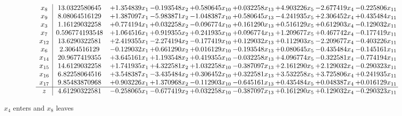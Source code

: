 \documentclass[10pt]{article}
\begin{document}
 \[\begin{array}{c| c c@{\hskip 2pt} c@{\hskip 2pt} c@{\hskip 2pt} c@{\hskip 2pt} c@{\hskip 2pt} c@{\hskip 2pt} c@{\hskip 2pt} }
 x_{8}   &  13.0322580645 & + 1.354839 x_{1} & -0.193548 x_{2} & + 0.580645 x_{10} & + 0.032258 x_{13} & + 4.903226 x_{5} & -2.677419 x_{4} & -0.225806 x_{11}\\
 x_{9}   &  8.08064516129 & + 1.387097 x_{1} & -5.983871 x_{2} & -1.048387 x_{10} & + 0.580645 x_{13} & -4.241935 x_{5} & + 2.306452 x_{4} & + 0.435484 x_{11}\\
 x_{3}   &  1.16129032258 & + 0.774194 x_{1} & + 0.032258 x_{2} & -0.096774 x_{10} & + 0.161290 x_{13} & + 0.516129 x_{5} & + 0.612903 x_{4} & -0.129032 x_{11}\\
 x_{7}   &  0.596774193548 & + 1.064516 x_{1} & + 0.919355 x_{2} & + 0.241935 x_{10} & + 0.096774 x_{13} & + 1.209677 x_{5} & + 0.467742 x_{4} & -0.177419 x_{11}\\
 x_{12}   &  13.6290322581 & + 2.419355 x_{1} & -2.274194 x_{2} & -0.177419 x_{10} & + 0.129032 x_{13} & + 0.112903 x_{5} & -2.209677 x_{4} & -0.403226 x_{11}\\
 x_{6}   &  2.3064516129 & -0.129032 x_{1} & + 0.661290 x_{2} & + 0.016129 x_{10} & -0.193548 x_{13} & + 0.080645 x_{5} & -0.435484 x_{4} & -0.145161 x_{11}\\
 x_{14}   &  20.9677419355 & + 3.645161 x_{1} & + 1.193548 x_{2} & + 0.419355 x_{10} & -0.032258 x_{13} & + 4.096774 x_{5} & -0.322581 x_{4} & -0.774194 x_{11}\\
 x_{15}   &  14.6129032258 & + 1.741935 x_{1} & + 4.322581 x_{2} & + 1.032258 x_{10} & -0.387097 x_{13} & + 2.161290 x_{5} & + 2.129032 x_{4} & -0.290323 x_{11}\\
 x_{16}   &  6.82258064516 & + 3.548387 x_{1} & -3.435484 x_{2} & + 0.306452 x_{10} & + 0.322581 x_{13} & + 3.532258 x_{5} & + 3.725806 x_{4} & + 0.241935 x_{11}\\
 x_{17}   &  9.85483870968 & + 0.903226 x_{1} & + 1.370968 x_{2} & -0.112903 x_{10} & -0.645161 x_{13} & + 0.435484 x_{5} & + 0.048387 x_{4} & + 0.016129 x_{11}\\
\hline
z    &  4.61290322581 & -0.258065 x_{1} & -0.677419 x_{2} & + 0.032258 x_{10} & -0.387097 x_{13} & + 0.161290 x_{5} & + 0.129032 x_{4} & -0.290323 x_{11}\\
\end{array}\]


 $ x_{4} $ enters and $ x_{8} $ leaves 
\end{document}
